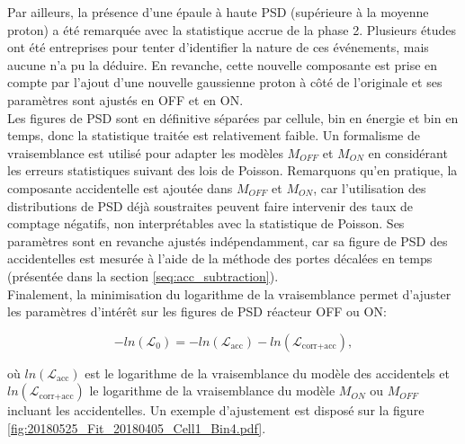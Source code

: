 Par ailleurs, la présence d'une épaule à haute PSD (supérieure à la moyenne proton) a été remarquée avec la statistique accrue de la phase 2. Plusieurs études ont été entreprises pour tenter d'identifier la nature de ces événements, mais aucune n'a pu la déduire. En revanche, cette nouvelle composante est prise en compte par l'ajout d'une nouvelle gaussienne proton à côté de l'originale et ses paramètres sont ajustés en OFF et en ON.\\

Les figures de PSD sont en définitive séparées par cellule, bin en énergie et bin en temps, donc la statistique traitée est relativement faible. Un formalisme de vraisemblance est utilisé pour adapter les modèles $M_{OFF}$ et $M_{ON}$ en considérant les erreurs statistiques suivant des lois de Poisson. Remarquons qu'en pratique, la composante accidentelle est ajoutée dans $M_{OFF}$ et $M_{ON}$, car l'utilisation des distributions de PSD déjà soustraites peuvent faire intervenir des taux de comptage négatifs, non interprétables avec la statistique de Poisson. Ses paramètres sont en revanche ajustés indépendamment, car sa figure de PSD des accidentelles est mesurée à l'aide de la méthode des portes décalées en temps (présentée dans la section \ref{seq:acc_subtraction}).\\

Finalement, la minimisation du logarithme de la vraisemblance permet d'ajuster les paramètres d'intérêt sur les figures de PSD réacteur OFF ou ON:

\begin{equation}
    - ln(\mathcal{L}_0) = - ln(\mathcal{L}_\textrm{acc}) - ln(\mathcal{L}_\textrm{corr+acc}),
\end{equation}

\bigbreak

où $ln(\mathcal{L}_\textrm{acc})$ est le logarithme de la vraisemblance du modèle des accidentels et $ln(\mathcal{L}_\textrm{corr+acc})$ le logarithme de la vraisemblance du modèle $M_{ON}$ ou $M_{OFF}$ incluant les accidentelles. Un exemple d'ajustement est disposé sur la figure \ref{fig:20180525_Fit_20180405_Cell1_Bin4.pdf}.\\


